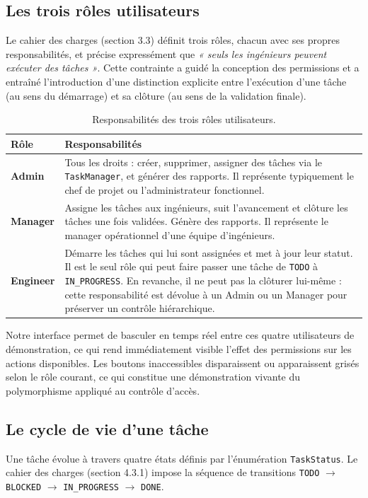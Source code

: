 \documentclass[11pt]{article}
\begin{document}
\subsection{Les trois rôles utilisateurs}
Le cahier des charges (section 3.3) définit trois rôles, chacun avec ses
propres responsabilités, et précise expressément que \textit{« seuls les
ingénieurs peuvent exécuter des tâches »}. Cette contrainte a guidé la
conception des permissions et a entraîné l'introduction d'une distinction
explicite entre l'exécution d'une tâche (au sens du démarrage) et sa
clôture (au sens de la validation finale).

\begin{table}[H]
\centering
\small
\begin{tabular}{p{2.5cm}p{12cm}}
\toprule
\textbf{Rôle} & \textbf{Responsabilités} \\
\midrule
\textbf{Admin}     & Tous les droits : créer, supprimer, assigner des tâches via le
                    \texttt{TaskManager}, et générer des rapports. Il représente
                    typiquement le chef de projet ou l'administrateur fonctionnel. \\
\textbf{Manager}   & Assigne les tâches aux ingénieurs, suit l'avancement et clôture
                    les tâches une fois validées. Génère des rapports. Il représente
                    le manager opérationnel d'une équipe d'ingénieurs. \\
\textbf{Engineer}  & Démarre les tâches qui lui sont assignées et met à jour leur
                    statut. Il est le seul rôle qui peut faire passer une tâche de
                    \texttt{TODO} à \texttt{IN\_PROGRESS}. En revanche, il ne peut
                    pas la clôturer lui-même : cette responsabilité est dévolue à un
                    Admin ou un Manager pour préserver un contrôle hiérarchique. \\
\bottomrule
\end{tabular}
\caption{Responsabilités des trois rôles utilisateurs.}
\end{table}

Notre interface permet de basculer en temps réel entre ces quatre
utilisateurs de démonstration, ce qui rend immédiatement visible l'effet
des permissions sur les actions disponibles. Les boutons inaccessibles
disparaissent ou apparaissent grisés selon le rôle courant, ce qui
constitue une démonstration vivante du polymorphisme appliqué au contrôle
d'accès.

\subsection{Le cycle de vie d'une tâche}
Une tâche évolue à travers quatre états définis par l'énumération
\texttt{TaskStatus}. Le cahier des charges (section 4.3.1) impose la
séquence de transitions \texttt{TODO} $\rightarrow$ \texttt{BLOCKED}
$\rightarrow$ \texttt{IN\_PROGRESS} $\rightarrow$ \texttt{DONE}.
\end{document}
